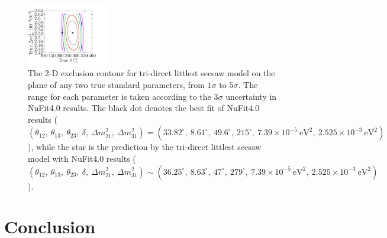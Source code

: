 \documentclass[a4paper,11pt]{article}
\begin{document}
\begin{figure}[!h]
\includegraphics[width=0.32\textwidth]{figs/SR_dCP_ldm.pdf}
 \caption{\label{fig:SR_2D}The 2-D exclusion contour for tri-direct littlest seesaw model on the plane of any two true standard parameters, from $1\sigma$ to $5\sigma$. The range for each parameter is taken according to the $3\sigma$ uncertainty in NuFit4.0 results. The black dot denotes the best fit of NuFit4.0 results ($(\theta_{12},~\theta_{13},~\theta_{23},~\delta,~\Delta m_{21}^2,~\Delta m_{31}^2)=(33.82^\circ,~8.61^\circ,~49.6^\circ,~215^\circ,~7.39\times10^{-5}~\text{eV}^2,~2.525\times10^{-3}~\text{eV}^2)$), while the star is the prediction by the tri-direct littlest seesaw model with NuFit4.0 results ($(\theta_{12},~\theta_{13},~\theta_{23},~\delta,~\Delta m_{21}^2,~\Delta m_{31}^2)\sim(36.25^\circ,~8.63^\circ,~47^\circ,~279^\circ,~7.39\times10^{-5}~\text{eV}^2,~2.525\times10^{-3}~\text{eV}^2)$).}
\end{figure}



\section{Conclusion}



\end{document}
